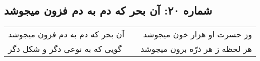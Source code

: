 \begin{center}
\section*{شماره ۲۰: آن بحر که دم به دم فزون میجوشد}
\label{sec:020}
\begin{longtable}{l p{0.5cm} r}
آن بحر که دم به دم فزون میجوشد
&&
وز حسرت او هزار خون میجوشد
\\
گویی که به نوعی دگر و شکل دگر
&&
هر لحظه ز هر ذرّه برون میجوشد
\\
\end{longtable}
\end{center}
